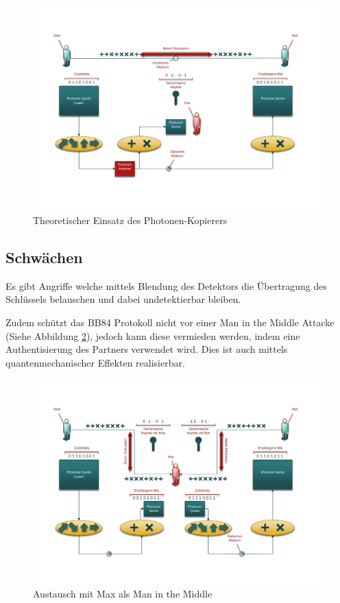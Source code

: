   \begin{figure}
    \centering
    \includegraphics[height=0.45\textheight]{crypto/BB84Eve-Clone.pdf}
    \caption{Theoretischer Einsatz des Photonen-Kopierers\label{crypto:BB84Clone}}
  \end{figure}

  \subsection{Schw\"achen}
  Es gibt Angriffe welche mittels Blendung des Detektors die \"Ubertragung des Schl\"ussels belauschen
  und dabei undetektierbar bleiben. \cite{qc:detector}

  Zudem sch\"utzt das BB84 Protokoll nicht vor einer Man in the Middle Attacke (Siehe Abbildung \ref{crypto:BB84Max}),
  jedoch kann diese vermieden werden, indem eine Authentisierung des Partners verwendet wird.
  Dies ist auch mittels quantenmechanischer Effekten realisierbar. \cite{qc:Authentisierung}

  \begin{figure}
    \centering
    \includegraphics[height=0.45\textheight]{crypto/BB84Max.pdf}
    \caption{Austausch mit Max als Man in the Middle\label{crypto:BB84Max}}
  \end{figure}

